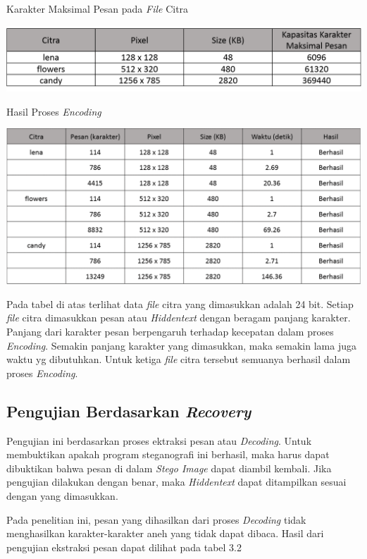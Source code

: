 	\begin{table}[H]
		\centering
		\caption{Karakter Maksimal Pesan pada \emph{File} Citra}
		\includegraphics[width=1.0\textwidth]{gambar/table_karaktermax}
		\label{tabel_karaktermax}
	\end{table}

	\begin{table}[H]
		\centering
		\caption{Hasil Proses \emph{Encoding}}
		\includegraphics[width=1.0\textwidth]{gambar/table_hasilencode}
		\label{tabel_hasilencode2}
	\end{table}

	Pada tabel di atas terlihat data \emph{file} citra yang dimasukkan adalah 24 bit. Setiap  \emph{file} citra dimasukkan pesan atau \emph{Hiddentext} dengan beragam panjang karakter. Panjang dari karakter pesan berpengaruh terhadap kecepatan dalam proses \emph{Encoding}. Semakin panjang karakter yang dimasukkan, maka semakin lama juga waktu yg dibutuhkan. Untuk ketiga \emph{file} citra tersebut semuanya berhasil dalam proses \emph{Encoding}.
	
	\subsection{Pengujian Berdasarkan \emph{Recovery}}
	Pengujian ini berdasarkan proses ektraksi pesan atau \emph{Decoding}. Untuk membuktikan apakah program steganografi ini berhasil, maka harus dapat dibuktikan bahwa pesan di dalam \emph{Stego Image} dapat diambil kembali. Jika pengujian dilakukan dengan benar, maka \emph{Hiddentext} dapat ditampilkan sesuai dengan yang dimasukkan. 
	
	Pada penelitian ini, pesan yang dihasilkan dari proses \emph{Decoding} tidak menghasilkan karakter-karakter aneh yang tidak dapat dibaca. Hasil dari pengujian ekstraksi pesan dapat dilihat pada tabel 3.2
	 

